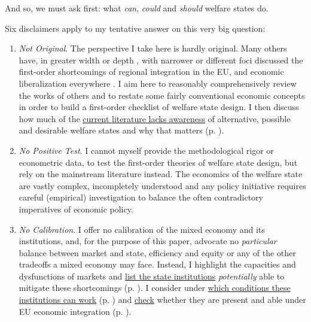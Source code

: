 \documentclass[11pt,a4paper,oneside,openright]{article}
\begin{document}
And so, we must ask first: 
what \emph{can}, \emph{could} and \emph{should} welfare states do. 

Six disclaimers apply to my tentative answer on this very big question: \label{sec:disclaimers}

\begin{enumerate}
	\item \label{it:not-original} \emph{Not Original}. 
		The perspective I take here is hardly original. 
		Many others have, in greater width \citep{Stiglitz2002} or depth \citep{Sinn2004}, with narrower \citep{Scharpf1997} or different foci \citep{Zurn-2000-aa} discussed the first-order shortcomings of regional integration in the \gls{EU}, and economic liberalization everywhere \citep{Stiglitz2002}. 
		I aim here to reasonably comprehensively review the works of others and to restate some fairly conventional economic concepts in order to build a first-order checklist of welfare state design. 
		I then discuss how much of the \hyperref[sec:Literature]{current literature lacks awareness} of alternative, possible and desirable welfare states and why that matters (p. \pageref{sec:Literature}).
	
	\item \label{it:no-test} \emph{No Positive Test}. 
		I cannot myself provide the methodological rigor or econometric data, to test the first-order theories of welfare state design, but rely on the mainstream literature instead. 
		The economics of the welfare state are vastly complex, incompletely understood and any policy initiative requires careful (empirical) investigation to balance the often contradictory imperatives of economic policy. 
	
	\item \label{it:no-calibration} \emph{No Calibration}. 
		I offer no calibration of the mixed economy and its institutions, and, for the purpose of this paper, advocate no \emph{particular} balance between market and state, efficiency and equity or any of the other tradeoffs a mixed economy may face. 
		Instead, I highlight the capacities and dysfunctions of markets and \hyperref[sec:ends]{list the state institutions} \emph{potentially} able to mitigate these shortcomings (p. \pageref{sec:ends}). 
		I consider under \hyperref[sec:means]{which conditions these institutions can work} (p. \pageref{sec:means}) and \hyperref[sec:defunct]{check} whether they are present and able under \gls{EU} economic integration (p. \pageref{sec:defunct}).
	

\end{enumerate}
\end{document}
